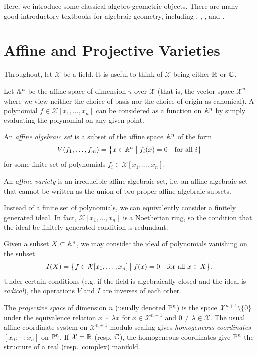 \documentclass[cclicense]{hmcthesis}
\newcommand*{\F}{\mathcal{X}}
\newcommand*{\vbar}{\;\big\vert\;}
\numberwithin{equation}{chapter}
\numberwithin{thmcounter}{chapter}
\begin{document}
    Here, we introduce some classical algebro-geometric objects.  There are
    many good introductory textbooks for algebraic geometry, including
    \citep{Invitation}, \citep{Sha94}, \citep{Hart}, and \citep{Mum99}.

\section{Affine and Projective Varieties}
    \label{sec:varieties}
    Throughout, let $\F$ be a field.  It is useful to think of $\F$ being either
    $\mathbb{R}$ or $\mathbb{C}$.

    Let $\mathbb{A}^n$ be the affine space of dimension $n$ over $\F$ (that is, the
    vector space $\F^n$ where we view neither the choice of basis nor the choice
    of origin as canonical).  A polynomial $f \in \F[x_1, \ldots, x_n]$ can be
    considered as a function on $\mathbb{A}^n$ by simply evaluating the polynomial on
    any given point.

    \begin{definition}
        An \emph{affine algebraic set} is a subset of the affine space $\mathbb{A}^n$
        of the form
        \[
            V(f_1, \ldots, f_m)
            = \cdel[\big]{x \in \A^n \vbar f_i(x) = 0 \quad\text{for all $i$}}
        \]
        for some finite set of polynomials $f_i \in \F[x_1, \ldots, x_n]$.

        An \emph{affine variety} is an irreducible affine algebraic set, i.e. an
        affine algebraic set that cannot be written as the union of two proper
        affine algebraic subsets.
    \end{definition}
    \noindent Instead of a finite set of polynomials, we can equivalently
    consider a finitely generated ideal.  In fact, $\F[x_1,\ldots,x_n]$ is a
    Noetherian ring, so the condition that the ideal be finitely generated
    condition is redundant.

    Given a subset $X \subset \mathbb{A}^n$, we may consider the ideal of polynomials
    vanishing on the subset
    \[
        I(X) = \cdel[\big]{f \in \F[x_1, \ldots, x_n] \vbar f(x) = 0 \quad\text{for
        all $x \in X$}}.
    \]
    Under certain conditions (e.g. if the field is algebraically closed and the
    ideal is \emph{radical}), the operations $V$ and $I$ are inverses of each other.

    \begin{definition}
        The \emph{projective space} of dimension $n$ (usually denoted $\mathbb{P}^n$)
        is the space $\F^{n+1}\setminus \{0\}$ under the equivalence relation $x
        \sim \lambda x$ for $x \in \F^{n+1}$ and $0 \ne \lambda \in \F$.  The
        usual affine coordinate system on $\F^{n+1}$ modulo scaling gives
        \emph{homogeneous coordinates} $[x_0: \cdots: x_n]$ on $\mathbb{P}^n$.  If
        $\F = \R$ (resp.  $\mathbb{C}$), the homogeneous coordinates give $\mathbb{P}^n$ the
        structure of a real (resp.\ complex) manifold.
    \end{definition}
\end{document}
